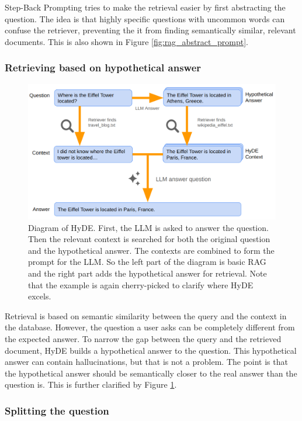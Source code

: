 Step-Back Prompting \cite{zheng2023takeastepback} tries to make the retrieval easier by first abstracting the question. The idea is that highly specific questions with uncommon words can confuse the retriever, preventing the it from finding semantically similar, relevant documents. This is also shown in Figure \ref{fig:rag_abstract_prompt}.

\subsubsection{Retrieving based on hypothetical answer}

\begin{figure}[h]
	\centering
	\includegraphics[width=0.9\linewidth]{fig/rag_hyde.png}
	\caption{Diagram of HyDE. First, the LLM is asked to answer the question. Then the relevant context is searched for both the original question and the hypothetical answer. The contexts are combined to form the prompt for the LLM. So the left part of the diagram is basic RAG and the right part adds the hypothetical answer for retrieval. Note that the example is again cherry-picked to clarify where HyDE excels.}
	\label{fig:rag_hyde}
\end{figure}

Retrieval is based on semantic similarity between the query and the context in the database. However, the question a user asks can be completely different from the expected answer. To narrow the gap between the query and the retrieved document, HyDE \cite{gao2023precisehyde} builds a hypothetical answer to the question. This hypothetical answer can contain hallucinations, but that is not a problem. The point is that the hypothetical answer should be semantically closer to the real answer than the question is. This is further clarified by Figure \ref{fig:rag_hyde}.

\subsubsection{Splitting the question}

